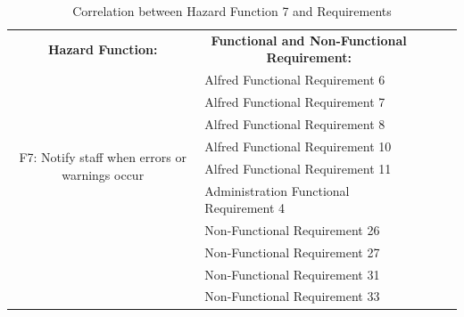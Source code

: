 \documentclass [10pt]{article}
\begin{document}

\begin{table}
\centering
\begin{tabular}{|c|l|lll}
\cline{1-2}
\textbf{Hazard Function:} & \multicolumn{1}{c|}{\textbf{Functional and Non-Functional Requirement:}} &  &  &  \\ \cline{1-2}
\multirow{8}{*}{F7: Notify staff when errors or warnings occur} 
				      & Alfred Functional Requirement 6	&  &  &  \\ \cline{2-2}
                                        & Alfred Functional Requirement 7	&  &  &  \\ \cline{2-2}
                                        & Alfred Functional Requirement 8	&  &  &  \\ \cline{2-2}
                                        & Alfred Functional Requirement 10	&  &  &  \\ \cline{2-2}
                                        & Alfred Functional Requirement 11	&  &  &  \\ \cline{2-2}
                                        & Administration Functional Requirement 4	&  &  &  \\ \cline{2-2}
                                        & Non-Functional Requirement 26	&  &  &  \\ \cline{2-2}
                                        & Non-Functional Requirement 27	&  &  &  \\ \cline{2-2}
                                        & Non-Functional Requirement 31	&  &  &  \\ \cline{2-2}
                                        & Non-Functional Requirement 33	&  &  &  \\ \cline{1-2}
\end{tabular}
\caption{Correlation between Hazard Function 7 and Requirements}  
\end{table}


\end{document}
